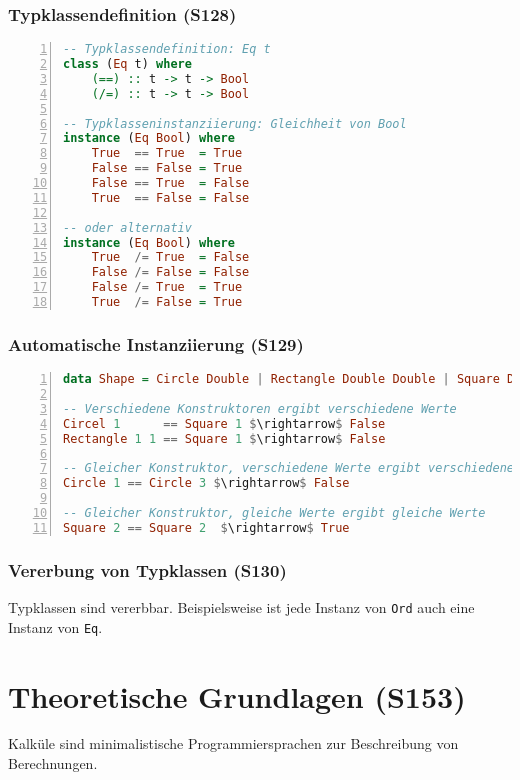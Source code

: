 \subsubsection{Typklassendefinition (S128)}
\begin{minipage}{\linewidth}
\begin{lstlisting}[frame=single,numbers=left,mathescape,language=Haskell]
-- Typklassendefinition: Eq t
class (Eq t) where
	(==) :: t -> t -> Bool
	(/=) :: t -> t -> Bool

-- Typklasseninstanziierung: Gleichheit von Bool
instance (Eq Bool) where
	True  == True  = True
	False == False = True
	False == True  = False
	True  == False = False

-- oder alternativ
instance (Eq Bool) where
	True  /= True  = False
	False /= False = False
	False /= True  = True
	True  /= False = True
\end{lstlisting}
\end{minipage}

\subsubsection{Automatische Instanziierung (S129)}
\begin{minipage}{\linewidth}
\begin{lstlisting}[frame=single,numbers=left,mathescape,language=Haskell]
data Shape = Circle Double | Rectangle Double Double | Square Double deriving Eq

-- Verschiedene Konstruktoren ergibt verschiedene Werte
Circel 1      == Square 1 $\rightarrow$ False
Rectangle 1 1 == Square 1 $\rightarrow$ False

-- Gleicher Konstruktor, verschiedene Werte ergibt verschiedene Werte
Circle 1 == Circle 3 $\rightarrow$ False

-- Gleicher Konstruktor, gleiche Werte ergibt gleiche Werte
Square 2 == Square 2  $\rightarrow$ True
\end{lstlisting}
\end{minipage}

\subsubsection{Vererbung von Typklassen (S130)}
Typklassen sind vererbbar. Beispielsweise ist jede Instanz von \texttt{Ord} auch eine Instanz von \texttt{Eq}.



\section{Theoretische Grundlagen (S153)}
Kalküle sind minimalistische Programmiersprachen zur Beschreibung von Berechnungen.	

